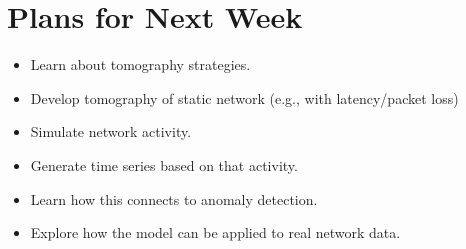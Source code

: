 \documentclass{weeklyreport}
\begin{document}
\section*{Plans for Next Week}

\begin{itemize}
	\item Learn about tomography strategies.
	\item Develop tomography of static network (e.g., with latency/packet loss)
	\item Simulate network activity.
	\item Generate time series based on that activity.
	\item Learn how this connects to anomaly detection.
	\item Explore how the model can be applied to real network data.
\end{itemize}
\end{document}

